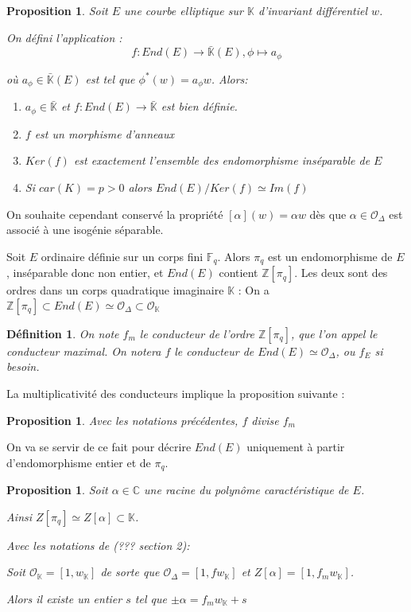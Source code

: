 \documentclass{article}
\newcommand{\Z}[0]{\mathbb{Z}}
\newcommand{\C}[0]{\mathbb{C}}
\newcommand{\K}[0]{\mathbb{K}}
\newcommand{\Kb}[0]{\bar{\K}}
\newcommand{\OR}[0]{\mathcal{O}}
\newcommand{\F}[0]{\mathbb{F}}
\newtheorem{Prop}[The]{Proposition}
\newtheorem{Def}[The]{Définition}
\begin{document}
\begin{Prop}
	Soit $E$ une courbe elliptique sur $\K$ d'invariant différentiel $w$. 
	
	On défini l'application :
	\begin{equation*}
		f : End(E)\rightarrow\Kb(E) , \phi\longmapsto a_{\phi}
	\end{equation*}
	
	où $a_{\phi}\in\Kb(E)$ est tel que $\phi^{*}(w) = a_{\phi}w$. Alors:
	
	\begin{enumerate}
		\item $a_{\phi}\in\Kb$ et $f: End(E)\rightarrow\Kb$ est bien définie. 
		\item $f$ est un morphisme d'anneaux
		\item $Ker(f)$ est exactement l'ensemble des endomorphisme inséparable de $E$
		\item Si $car(K) = p > 0$ alors $End(E)/Ker(f)\simeq Im(f)$
	\end{enumerate}
\end{Prop}

On souhaite cependant conservé la propriété $[\alpha](w) = \alpha w$ dès que $\alpha\in\OR_{\Delta}$ est associé à une isogénie séparable.

Soit $E$ ordinaire définie sur un corps fini $\F_{q}$. Alors $\pi_{q}$ est un endomorphisme de $E$, inséparable donc non entier, et $End(E)$ contient $\Z[\pi_{q}]$. Les deux sont des ordres dans un corps quadratique imaginaire $\K$ : On a $\Z[\pi_{q}]\subset End(E)\simeq\OR_{\Delta}\subset\OR_{\K}$

\begin{Def}
	On note $f_{m}$ le conducteur de l'ordre $\Z[\pi_{q}]$, que l'on appel le conducteur maximal.
	On notera $f$ le conducteur de $End(E)\simeq\OR_{\Delta}$, ou $f_{E}$ si besoin.
\end{Def}

La multiplicativité des conducteurs implique la proposition suivante :

\begin{Prop}
	Avec les notations précédentes, $f$ divise $f_{m}$
\end{Prop}

On va se servir de ce fait pour décrire $End(E)$ uniquement à partir d'endomorphisme entier et de $\pi_{q}$.

\begin{Prop}
	
	Soit $\alpha\in\C$ une racine du polynôme caractéristique de $E$.
	 
	Ainsi $Z[\pi_{q}] \simeq Z[\alpha] \subset \K$.
	
	Avec les notations de (??? section 2):
	
	Soit $\OR_{\K} = \left[ 1, w_{\K}\right] $ de sorte que $\OR_{\Delta} = \left[ 1, fw_{\K}\right] $ et $Z[\alpha] = \left[ 1, f_{m}w_{\K}\right] $.
	
	Alors il existe un entier $s$ tel que $\pm\alpha = f_{m}w_{\K} + s$
	
\end{Prop}
\end{document}
